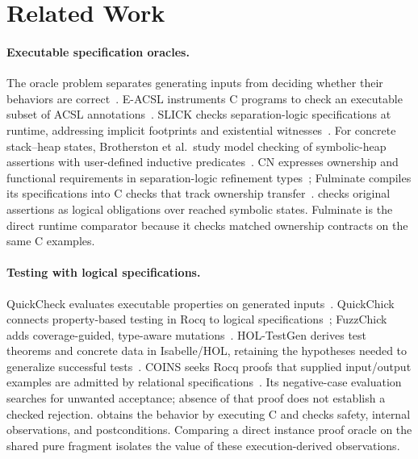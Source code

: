 \section{Related Work}
\label{sec:related-work}
\paragraph{Executable specification oracles.}
The oracle problem separates generating inputs from deciding whether their
behaviors are correct~\cite{barr2015oracle}. E-ACSL instruments C programs
to check an executable subset of ACSL annotations~\cite{signoles2017eacsl}.
SLICK checks separation-logic specifications at runtime, addressing implicit
footprints and existential witnesses~\cite{nguyen2008slick}.
For concrete stack--heap states, Brotherston et al.\ study model checking
of symbolic-heap assertions with user-defined inductive
predicates~\cite{brotherston2016model}.
CN expresses ownership and functional requirements in separation-logic
refinement types~\cite{pulte2023cn}; Fulminate compiles its specifications
into C checks that track ownership transfer~\cite{banerjee2025fulminate}.
\tespec{} checks original assertions as logical obligations over reached
symbolic states. Fulminate is the direct runtime comparator because it
checks matched ownership contracts on the same C examples.

\paragraph{Testing with logical specifications.}
QuickCheck evaluates executable properties on generated
inputs~\cite{claessen2000quickcheck}. QuickChick connects property-based
testing in Rocq to logical
specifications~\cite{paraskevopoulou2015quickchick,paraskevopoulou2022computing};
FuzzChick adds coverage-guided, type-aware
mutations~\cite{lampropoulos2019fuzzchick}.
HOL-TestGen derives test theorems and concrete data in Isabelle/HOL, retaining
the hypotheses needed to generalize successful tests~\cite{brucker2009holtestgen}.
COINS seeks Rocq proofs that supplied input/output examples are admitted
by relational specifications~\cite{yang2026coins}. Its negative-case
evaluation searches for unwanted acceptance; absence of that proof does
not establish a checked rejection.
\tespec{} obtains the behavior by executing C and checks safety, internal
observations, and postconditions. Comparing a direct instance proof oracle
on the shared pure fragment isolates the value of these execution-derived
observations.

